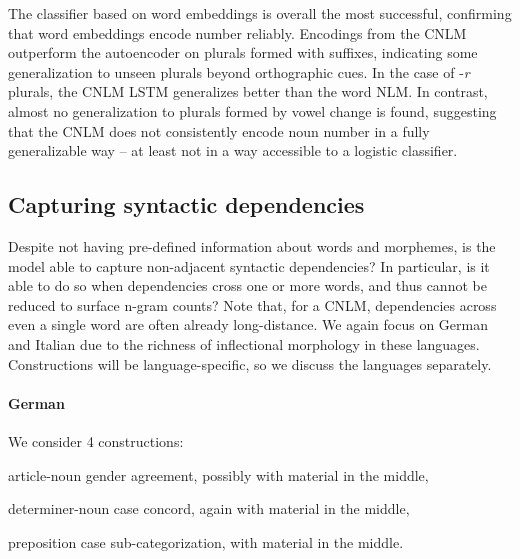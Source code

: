 The classifier based on word embeddings is overall the most successful, confirming that word embeddings encode number reliably.
Encodings from the CNLM outperform the autoencoder on plurals formed with suffixes, indicating some generalization to unseen plurals beyond orthographic cues.
In the case of -\emph{r} plurals, the CNLM LSTM generalizes better than the word NLM.
In contrast, almost no generalization to plurals formed by vowel change is found, suggesting that the CNLM does not consistently encode noun number in a fully generalizable way -- at least not in a way accessible to a logistic classifier.


\subsection{Capturing syntactic dependencies}
\label{sec:dependencies}

Despite not having pre-defined information about words and morphemes, is the model able to capture non-adjacent syntactic dependencies?
In particular, is it able to do so when dependencies cross one or more words, and thus cannot be reduced to surface n-gram counts?
Note that, for a CNLM, dependencies across even a single word are often already long-distance. %
We again focus on German and Italian due to the richness of inflectional morphology in these languages.
Constructions will be language-specific, so we discuss the languages separately. %





\paragraph{German} We consider 4 constructions:
\begin{inparaenum}[i)]
\item article-noun gender agreement, possibly with material in the middle,
\item determiner-noun case concord, again with material in the middle,
\item preposition case sub-categorization, with material in the middle.
\end{inparaenum}


